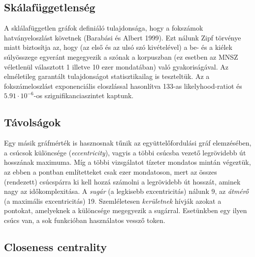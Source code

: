 \documentclass{llncs}
\newcommand{\embf}[1]{\textbf{#1}}
\newcommand{\bness}{bness}   %
\begin{document}
\subsection{Skálafüggetlenség} 
  A sklálafüggetlen gráfok definiáló tulajdonsága, hogy a fokszámok
    hatványeloszlást követnek (Barabási és Albert 1999). Ezt nálunk Zipf
    törvénye miatt 
    biztosítja az, hogy (az első és az ulsó szó kivételével) a be- és a kiélek
    súlyösszege egyeránt megegyezik a szónak a korpuszban (ez esetben az MNSZ
    véletlenül választott 1 illetve 10 ezer mondatában) való gyakoriságával.
    Az elméletileg garantált tulajdonságot statisztikailag is teszteltük. Az
    a fokszámeloszlást exponenciális eloszlással hasonlítva 133-as
    likelyhood-ratiot és $5.91\cdot 10^{-6}$-os szignifikanciaszintet kaptunk.

\subsection{Távolságok}
  Egy másik gráfmérték is hasznosnak tűnik az együttelőfordulási gráf
    elemzésében, a csúcsok különcsége (\emph{eccentricity}), vagyis a többi
    csúcsba vezető legrövidebb út hosszának maximuma. Míg a többi vizsgálatot
    tízeter mondatos mintán végeztük, az ebben a pontban említetteket csak ezer
    mondatoson, mert az összes (rendezett) csúcspárra ki kell hozzá számolni a legrövidebb
    út hosszát, aminek nagy az időkomplexitása.
    A \emph{sugár} (a legkisebb excentricitás) nálunk 9, 
    az \emph{átmérő} (a maximális excentricitás) 19.
    Szemléletesen \emph{kerületnek} hívják azokat a pontokat, amelyeknek a
    különcsége megegyezik a sugárral. Esetünkben egy ilyen csúcs van, a sok
    funkcióban használatos vessző token. 


\subsection{Closeness centrality}
\end{document}
